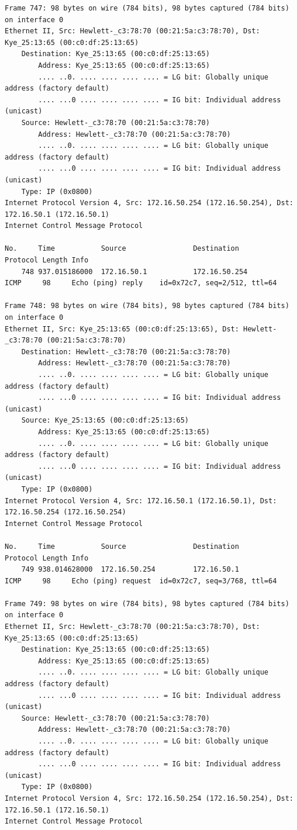 \documentclass[a4paper,11pt]{article}
\begin{document}
\begin{lstlisting}
Frame 747: 98 bytes on wire (784 bits), 98 bytes captured (784 bits) on interface 0
Ethernet II, Src: Hewlett-_c3:78:70 (00:21:5a:c3:78:70), Dst: Kye_25:13:65 (00:c0:df:25:13:65)
    Destination: Kye_25:13:65 (00:c0:df:25:13:65)
        Address: Kye_25:13:65 (00:c0:df:25:13:65)
        .... ..0. .... .... .... .... = LG bit: Globally unique address (factory default)
        .... ...0 .... .... .... .... = IG bit: Individual address (unicast)
    Source: Hewlett-_c3:78:70 (00:21:5a:c3:78:70)
        Address: Hewlett-_c3:78:70 (00:21:5a:c3:78:70)
        .... ..0. .... .... .... .... = LG bit: Globally unique address (factory default)
        .... ...0 .... .... .... .... = IG bit: Individual address (unicast)
    Type: IP (0x0800)
Internet Protocol Version 4, Src: 172.16.50.254 (172.16.50.254), Dst: 172.16.50.1 (172.16.50.1)
Internet Control Message Protocol

No.     Time           Source                Destination           Protocol Length Info
    748 937.015186000  172.16.50.1           172.16.50.254         ICMP     98     Echo (ping) reply    id=0x72c7, seq=2/512, ttl=64

Frame 748: 98 bytes on wire (784 bits), 98 bytes captured (784 bits) on interface 0
Ethernet II, Src: Kye_25:13:65 (00:c0:df:25:13:65), Dst: Hewlett-_c3:78:70 (00:21:5a:c3:78:70)
    Destination: Hewlett-_c3:78:70 (00:21:5a:c3:78:70)
        Address: Hewlett-_c3:78:70 (00:21:5a:c3:78:70)
        .... ..0. .... .... .... .... = LG bit: Globally unique address (factory default)
        .... ...0 .... .... .... .... = IG bit: Individual address (unicast)
    Source: Kye_25:13:65 (00:c0:df:25:13:65)
        Address: Kye_25:13:65 (00:c0:df:25:13:65)
        .... ..0. .... .... .... .... = LG bit: Globally unique address (factory default)
        .... ...0 .... .... .... .... = IG bit: Individual address (unicast)
    Type: IP (0x0800)
Internet Protocol Version 4, Src: 172.16.50.1 (172.16.50.1), Dst: 172.16.50.254 (172.16.50.254)
Internet Control Message Protocol

No.     Time           Source                Destination           Protocol Length Info
    749 938.014628000  172.16.50.254         172.16.50.1           ICMP     98     Echo (ping) request  id=0x72c7, seq=3/768, ttl=64

Frame 749: 98 bytes on wire (784 bits), 98 bytes captured (784 bits) on interface 0
Ethernet II, Src: Hewlett-_c3:78:70 (00:21:5a:c3:78:70), Dst: Kye_25:13:65 (00:c0:df:25:13:65)
    Destination: Kye_25:13:65 (00:c0:df:25:13:65)
        Address: Kye_25:13:65 (00:c0:df:25:13:65)
        .... ..0. .... .... .... .... = LG bit: Globally unique address (factory default)
        .... ...0 .... .... .... .... = IG bit: Individual address (unicast)
    Source: Hewlett-_c3:78:70 (00:21:5a:c3:78:70)
        Address: Hewlett-_c3:78:70 (00:21:5a:c3:78:70)
        .... ..0. .... .... .... .... = LG bit: Globally unique address (factory default)
        .... ...0 .... .... .... .... = IG bit: Individual address (unicast)
    Type: IP (0x0800)
Internet Protocol Version 4, Src: 172.16.50.254 (172.16.50.254), Dst: 172.16.50.1 (172.16.50.1)
Internet Control Message Protocol


\end{lstlisting}
\end{document}
